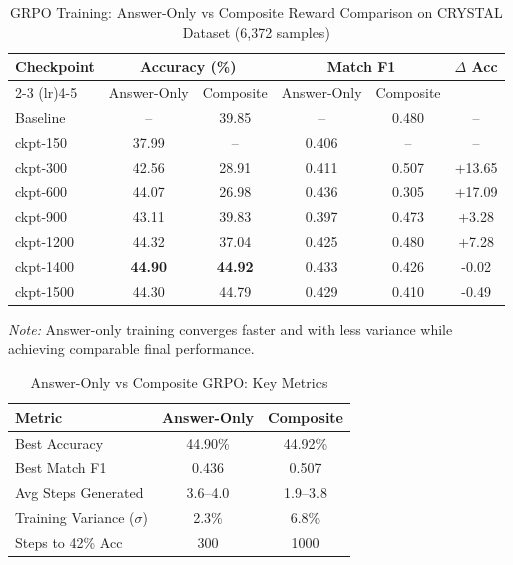 
\begin{table}[htbp]
\centering
\caption{GRPO Training: Answer-Only vs Composite Reward Comparison on CRYSTAL Dataset (6,372 samples)}
\label{tab:answer_only_vs_composite}
\begin{tabular}{lccccc}
\toprule
\textbf{Checkpoint} & \multicolumn{2}{c}{\textbf{Accuracy (\%)}} & \multicolumn{2}{c}{\textbf{Match F1}} & \textbf{$\Delta$ Acc} \\
\cmidrule(lr){2-3} \cmidrule(lr){4-5}
& Answer-Only & Composite & Answer-Only & Composite & \\
\midrule
Baseline & -- & 39.85 & -- & 0.480 & -- \\
ckpt-150 & 37.99 & -- & 0.406 & -- & -- \\
ckpt-300 & 42.56 & 28.91 & 0.411 & 0.507 & +13.65 \\
ckpt-600 & 44.07 & 26.98 & 0.436 & 0.305 & +17.09 \\
ckpt-900 & 43.11 & 39.83 & 0.397 & 0.473 & +3.28 \\
ckpt-1200 & 44.32 & 37.04 & 0.425 & 0.480 & +7.28 \\
ckpt-1400 & \textbf{44.90} & \textbf{44.92} & 0.433 & 0.426 & -0.02 \\
ckpt-1500 & 44.30 & 44.79 & 0.429 & 0.410 & -0.49 \\
\bottomrule
\end{tabular}
\vspace{0.5em}
\footnotesize
\textit{Note:} Answer-only training converges faster and with less variance while achieving comparable final performance.
\end{table}

\begin{table}[htbp]
\centering
\caption{Answer-Only vs Composite GRPO: Key Metrics}
\label{tab:answer_only_compact}
\begin{tabular}{lcc}
\toprule
\textbf{Metric} & \textbf{Answer-Only} & \textbf{Composite} \\
\midrule
Best Accuracy & 44.90\% & 44.92\% \\
Best Match F1 & 0.436 & 0.507 \\
Avg Steps Generated & 3.6--4.0 & 1.9--3.8 \\
Training Variance ($\sigma$) & 2.3\% & 6.8\% \\
Steps to 42\% Acc & 300 & 1000 \\
\bottomrule
\end{tabular}
\end{table}
